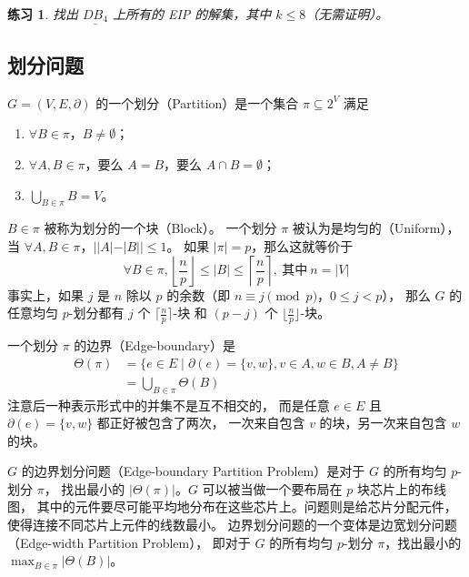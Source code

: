 \documentclass[12pt, a4paper]{article}
\newtheorem{exercise}{练习}
\begin{document}
\begin{exercise}
\label{Exercise 14}
找出 $\underline{DB_4}$ 上所有的 EIP 的解集，其中 $k \le 8$（无需证明）。
\end{exercise}

\subsection{划分问题}
\label{Subsection 3.3}

$G = (V, E, \partial)$ 的一个划分（Partition）是一个集合 $\pi \subseteq 2^V$ 满足
\begin{enumerate}[(1)]
	\item $\forall B \in \pi$，$B \neq \emptyset$；
	\item $\forall A, B \in \pi$，要么 $A = B$，要么 $A \cap B = \emptyset$；
	\item $\bigcup_{B \in \pi} B = V$。
\end{enumerate}

$B \in \pi$ 被称为划分的一个块（Block）。
一个划分 $\pi$ 被认为是均匀的（Uniform），当 $\forall A, B \in \pi$，$||A| − |B|| \le 1$。
如果 $|\pi| = p$，那么这就等价于
\begin{equation*}
\forall B \in \pi,
\left\lfloor\frac{n}{p}\right\rfloor \le |B| \le \left\lceil\frac{n}{p}\right\rceil,
\ \text{其中}\ n = |V|
\end{equation*}
事实上，如果 $j$ 是 $n$ 除以 $p$ 的余数（即 $n \equiv j \pmod p$，$0 \le j < p$），
那么 $G$ 的任意均匀 $p$-划分都有 $j$ 个 $\lceil\frac{n}{p}\rceil$-块
和 $(p - j)$ 个 $\lfloor\frac{n}{p}\rfloor$-块。

一个划分 $\pi$ 的边界（Edge-boundary）是
\begin{align*}
\Theta(\pi) & = \{e \in E \mid \partial(e) = \{v, w\}, v \in A, w \in B, A \ne B\} \\
	    & = \bigcup_{B \in \pi} \Theta(B)
\end{align*}
注意后一种表示形式中的并集不是互不相交的，
而是任意 $e \in E$ 且 $\partial(e) = \{v, w\}$ 都正好被包含了两次，
一次来自包含 $v$ 的块，另一次来自包含 $w$ 的块。

$G$ 的边界划分问题（Edge-boundary Partition Problem）是对于 $G$ 的所有均匀 $p$-划分 $\pi$，
找出最小的 $|\Theta(\pi)|$。$G$ 可以被当做一个要布局在 $p$ 块芯片上的布线图，
其中的元件要尽可能平均地分布在这些芯片上。问题则是给芯片分配元件，
使得连接不同芯片上元件的线数最小。
边界划分问题的一个变体是边宽划分问题（Edge-width Partition Problem），
即对于 $G$ 的所有均匀 $p$-划分 $\pi$，找出最小的 $\max_{B \in \pi} |\Theta(B)|$。
\end{document}
